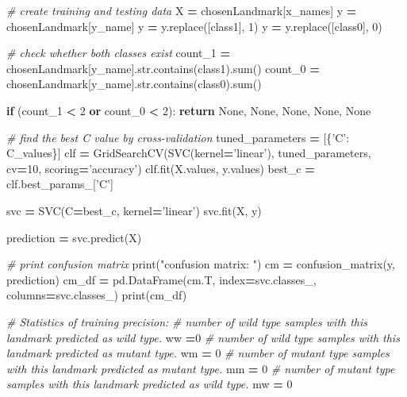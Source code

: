 \documentclass[10pt,letterpaper]{article}
\newenvironment{Shaded}{\begin{snugshade}}{\end{snugshade}}
\newcommand{\KeywordTok}[1]{\textcolor[rgb]{0.13,0.29,0.53}{\textbf{#1}}}
\newcommand{\DecValTok}[1]{\textcolor[rgb]{0.00,0.00,0.81}{#1}}
\newcommand{\StringTok}[1]{\textcolor[rgb]{0.31,0.60,0.02}{#1}}
\newcommand{\CommentTok}[1]{\textcolor[rgb]{0.56,0.35,0.01}{\textit{#1}}}
\newcommand{\VariableTok}[1]{\textcolor[rgb]{0.00,0.00,0.00}{#1}}
\newcommand{\ControlFlowTok}[1]{\textcolor[rgb]{0.13,0.29,0.53}{\textbf{#1}}}
\newcommand{\OperatorTok}[1]{\textcolor[rgb]{0.81,0.36,0.00}{\textbf{#1}}}
\newcommand{\BuiltInTok}[1]{#1}
\newcommand{\NormalTok}[1]{#1}
\begin{document}
\begin{Shaded}
\begin{Highlighting}[]
    \CommentTok{# create training and testing data}
\NormalTok{    X }\OperatorTok{=}\NormalTok{ chosenLandmark[x_names]}
\NormalTok{    y }\OperatorTok{=}\NormalTok{ chosenLandmark[y_name]}
\NormalTok{    y }\OperatorTok{=}\NormalTok{ y.replace([class1], }\DecValTok{1}\NormalTok{)}
\NormalTok{    y }\OperatorTok{=}\NormalTok{ y.replace([class0], }\DecValTok{0}\NormalTok{)}

    \CommentTok{# check whether both classes exist}
\NormalTok{    count_1 }\OperatorTok{=}\NormalTok{ chosenLandmark[y_name].}\BuiltInTok{str}\NormalTok{.contains(class1).}\BuiltInTok{sum}\NormalTok{()}
\NormalTok{    count_0 }\OperatorTok{=}\NormalTok{ chosenLandmark[y_name].}\BuiltInTok{str}\NormalTok{.contains(class0).}\BuiltInTok{sum}\NormalTok{()}

    \ControlFlowTok{if}\NormalTok{ (count_1 }\OperatorTok{<} \DecValTok{2} \KeywordTok{or}\NormalTok{ count_0 }\OperatorTok{<} \DecValTok{2}\NormalTok{):}
        \ControlFlowTok{return} \VariableTok{None}\NormalTok{, }\VariableTok{None}\NormalTok{, }\VariableTok{None}\NormalTok{, }\VariableTok{None}\NormalTok{, }\VariableTok{None}

    \CommentTok{# find the best C value by cross-validation}
\NormalTok{    tuned_parameters }\OperatorTok{=}\NormalTok{ [\{}\StringTok{'C'}\NormalTok{: C_values\}]}
\NormalTok{    clf }\OperatorTok{=}\NormalTok{ GridSearchCV(SVC(kernel}\OperatorTok{=}\StringTok{'linear'}\NormalTok{), tuned_parameters, cv}\OperatorTok{=}\DecValTok{10}\NormalTok{, scoring}\OperatorTok{=}\StringTok{'accuracy'}\NormalTok{)}
\NormalTok{    clf.fit(X.values, y.values)}
\NormalTok{    best_c }\OperatorTok{=}\NormalTok{ clf.best_params_[}\StringTok{'C'}\NormalTok{]}
    
\NormalTok{    svc }\OperatorTok{=}\NormalTok{ SVC(C}\OperatorTok{=}\NormalTok{best_c, kernel}\OperatorTok{=}\StringTok{'linear'}\NormalTok{)}
\NormalTok{    svc.fit(X, y)}
    
\NormalTok{    prediction }\OperatorTok{=}\NormalTok{ svc.predict(X)}

    \CommentTok{# print confusion matrix}
    \BuiltInTok{print}\NormalTok{(}\StringTok{"confusion matrix: "}\NormalTok{)}
\NormalTok{    cm }\OperatorTok{=}\NormalTok{ confusion_matrix(y, prediction)}
\NormalTok{    cm_df }\OperatorTok{=}\NormalTok{ pd.DataFrame(cm.T, index}\OperatorTok{=}\NormalTok{svc.classes_, columns}\OperatorTok{=}\NormalTok{svc.classes_)}
    \BuiltInTok{print}\NormalTok{(cm_df)}

    \CommentTok{# Statistics of training precision:}
    \CommentTok{# number of wild type samples with this landmark predicted as wild type.}
\NormalTok{    ww }\OperatorTok{=}\DecValTok{0}
    \CommentTok{# number of wild type samples with this landmark predicted as mutant type.}
\NormalTok{    wm }\OperatorTok{=} \DecValTok{0}
    \CommentTok{# number of mutant type samples with this landmark predicted as mutant type.}
\NormalTok{    mm }\OperatorTok{=} \DecValTok{0}
    \CommentTok{# number of mutant type samples with this landmark predicted as wild type.}
\NormalTok{    mw }\OperatorTok{=} \DecValTok{0}
    

\end{Highlighting}
\end{Shaded}
\end{document}
